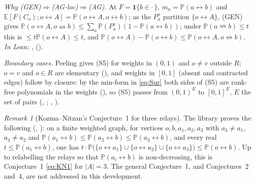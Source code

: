 \documentclass[11pt]{article}
\theoremstyle{definition}
\theoremstyle{remark}
\newtheorem{remark}[theorem]{Remark}
\newcommand{\PP}{\mathbb{P}}
\newcommand{\E}{\mathbb{E}}
\newcommand{\con}{\leftrightarrow}
\newcommand{\ncon}{\nleftrightarrow}
\newcommand{\one}{\mathbf 1}
\begin{document}
\emph{Why \textup{(GEN)}$\Rightarrow$\textup{(AG-loc)}$\Rightarrow$\textup{(AG)}.}  At $F=\one\{b\in\cdot\,\}$, $m_a=\PP(a\con b)$ and $\E[F(C_o);o\con A]=\PP(o\con A,o\con b)$;
as the $P^o_a$ partition $\{o\con A\}$, (GEN) gives $\PP(o\con A,o\ncon b)\le\sum_a\PP(P^o_a)(1-\PP(a\con b))$; under $\PP(a\ncon b)\le t$ this is
$\le t\PP(o\con A)\le t$, and $\PP(o\con A)-\PP(o\con b)\le\PP(o\con A,o\ncon b)$.  \emph{In Lean:} ,
 ().

\emph{Boundary cases.}  Peeling gives (S5) for weights in $(0,1)$ and $o\ne v$ outside $R$; $o=v$ and $o\in R$ are elementary
(), and weights in $[0,1]$ (absent and contracted edges) follow by closure: by the min-form in \eqref{eq:Sur} both sides
of (S5) are rank-free polynomials in the weights (), so (S5) passes from $(0,1)^E$ to $[0,1]^E$, $E$ the set of pairs
(, ; , ).

\begin{remark}[Kozma--Nitzan's Conjecture~1 for three relays]\label{rem:mult}
The library proves the following (, ): on a finite weighted graph,
for vertices $o,b,a_1,a_2,a_3$ with $a_3\ne a_1$, $a_3\ne a_2$ and $\PP(a_1\con b)\le\PP(a_2\con b)\le\PP(a_3\con b)$, and every real
$t\le\PP(a_1\con b)$, one has $t\cdot\PP\bigl(\{o\con a_1\}\cup\{o\con a_2\}\cup\{o\con a_3\}\bigr)\le\PP(o\con b)$.  Up to relabelling the
relays so that $\PP(a_i\con b)$ is non-decreasing, this is Conjecture~1 \eqref{eq:KN1} for $|A|=3$.  The general Conjecture~1, and
Conjectures~2 and~4, are not addressed in this development.
\end{remark}

\end{document}
